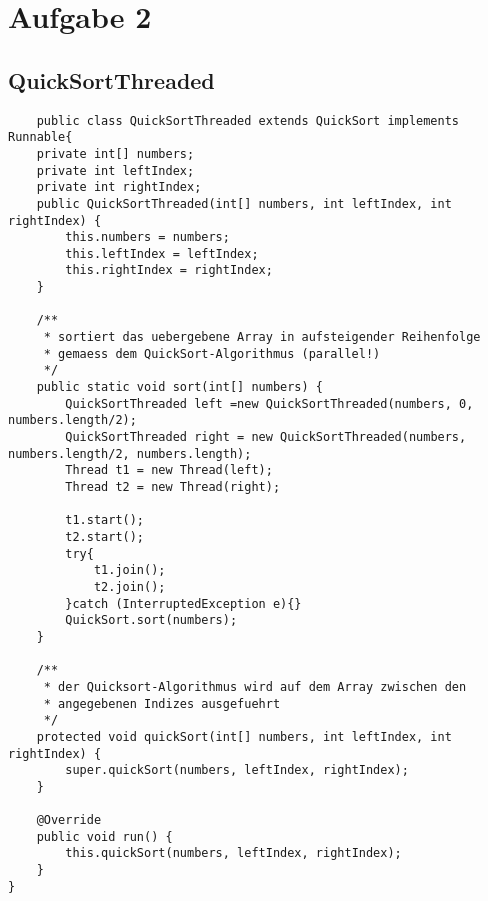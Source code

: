 \documentclass[12pt,a4paper,oneside,ngerman]{article}
\begin{document}
\section*{Aufgabe 2}
\subsection*{QuickSortThreaded}
\begin{lstlisting}
	public class QuickSortThreaded extends QuickSort implements Runnable{
	private int[] numbers;
	private int leftIndex;
	private int rightIndex;
	public QuickSortThreaded(int[] numbers, int leftIndex, int rightIndex) {
		this.numbers = numbers;
		this.leftIndex = leftIndex;
		this.rightIndex = rightIndex;
	}

	/**
	 * sortiert das uebergebene Array in aufsteigender Reihenfolge
	 * gemaess dem QuickSort-Algorithmus (parallel!)
	 */
	public static void sort(int[] numbers) {
		QuickSortThreaded left =new QuickSortThreaded(numbers, 0, numbers.length/2);
		QuickSortThreaded right = new QuickSortThreaded(numbers, numbers.length/2, numbers.length);
		Thread t1 = new Thread(left);
		Thread t2 = new Thread(right);

		t1.start();
		t2.start();
		try{
			t1.join();
			t2.join();
		}catch (InterruptedException e){}
		QuickSort.sort(numbers);
	}

	/**
	 * der Quicksort-Algorithmus wird auf dem Array zwischen den
	 * angegebenen Indizes ausgefuehrt
	 */
	protected void quickSort(int[] numbers, int leftIndex, int rightIndex) {
		super.quickSort(numbers, leftIndex, rightIndex);
	}

	@Override
	public void run() {
		this.quickSort(numbers, leftIndex, rightIndex);
	}
}
\end{lstlisting}
\end{document}
